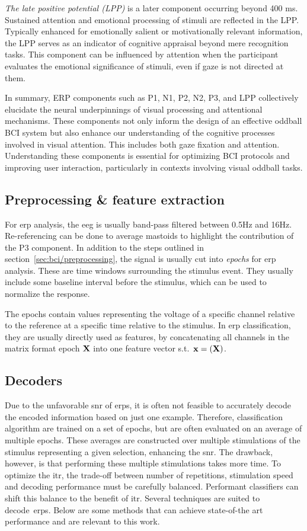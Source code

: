 \emph{The late positive potential (LPP)} is a later component occurring beyond 400 ms.
Sustained attention and emotional processing of stimuli are reflected in the
LPP.
Typically enhanced for emotionally salient or motivationally relevant
information, the LPP serves as an indicator of cognitive appraisal beyond mere
recognition tasks.
This component can be influenced by attention when the participant evaluates
the emotional significance of stimuli, even if gaze is not directed at them.

In summary, ERP components such as P1, N1, P2, N2, P3, and LPP collectively
elucidate the neural underpinnings of visual processing and attentional
mechanisms.
These components not only inform the design of an effective oddball BCI system
but also enhance our understanding of the cognitive processes involved in visual
attention.
This includes both gaze fixation and attention.
Understanding these components is essential for optimizing BCI protocols and
improving user interaction, particularly in contexts involving visual oddball
tasks.

\subsection{Preprocessing \& feature extraction}
For \ac{erp} analysis, the \ac{eeg} is usually band-pass filtered between 0.5Hz
and 16Hz.
Re-referencing can be done to average mastoids to highlight the contribution of
the P3 component.
In addition to the steps outlined in section~\ref{sec:bci/preprocessing},
the signal is usually cut into \emph{epochs} for \ac{erp} analysis.
These are time windows surrounding the stimulus event.
They usually include some baseline interval before the stimulus, which can be
used to normalize the response.

The epochs contain values representing the voltage of a specific channel relative to the
reference at a specific time relative to the stimulus.
In \ac{erp} classification, they are usually directly used as features, by
concatenating all channels in the matrix format epoch $\mathbf{X}$ into one feature
vector s.t.\ $\mat{x} = \mat\vec(\mat{X})$.

\subsection{Decoders}
Due to the unfavorable \ac{snr} of \acp{erp}, it is often not feasible to
accurately decode the encoded information based on just one example.
Therefore, classification algorithm are trained on a set of epochs, but are
often evaluated on an average of multiple epochs.
These averages are constructed over multiple stimulations of the stimulus
representing a given selection, enhancing the \ac{snr}.
The drawback, however, is that performing these multiple stimulations takes
more time.
To optimize the \ac{itr}, the trade-off between number of repetitions,
stimulation speed and decoding performance must be carefully balanced.
Performant classifiers can shift this balance to the benefit of \ac{itr}.
Several techniques are suited to decode~\acp{erp}.
Below are some methods that can achieve state-of-the art performance and are
relevant to this work.


